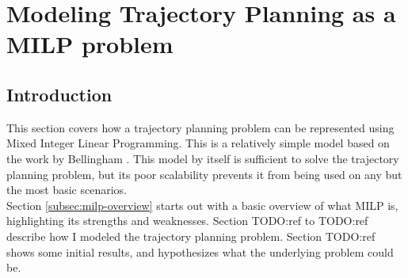 \section{Modeling Trajectory Planning as a MILP problem}
\label{section:modelingbasic}
\subsection{Introduction}
This section covers how a trajectory planning problem can be represented using Mixed Integer Linear Programming. This is a relatively simple model based on the work by Bellingham \cite{Bellingham2002}. This model by itself is sufficient to solve the trajectory planning problem, but its poor scalability prevents it from being used on any but the most basic scenarios. \\

Section \ref{subsec:milp-overview} starts out with a basic overview of what MILP is, highlighting its strengths and weaknesses. Section TODO:ref to TODO:ref describe how I modeled the trajectory planning problem. Section TODO:ref shows some initial results, and hypothesizes what the underlying problem could be.






